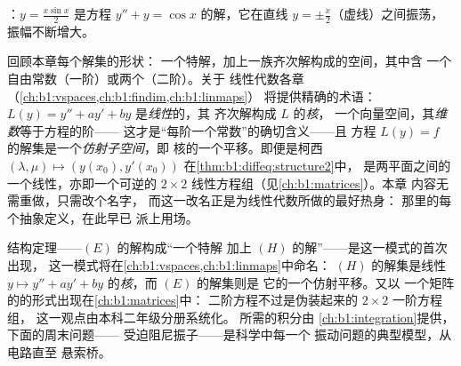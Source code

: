 \begin{omfigure}

{\small {}：$y = \frac{x \sin x}{2}$ 是方程 $y'' + y =
\cos x$ 的解，它在直线 $y = \pm\frac x2$（虚线）之间振荡，
振幅不断增大。}
\end{omfigure}

\begin{remark}[插曲：线性即几何]\label{rem:b1:diffeq:interlude}
回顾本章每个解集的形状：
一个特解，加上一族齐次解构成的空间，其中含
一个自由常数（一阶）或两个（二阶）。关于
线性代数各章（\cref{ch:b1:vspaces,ch:b1:findim,ch:b1:linmaps}）
将提供精确的术语：
 $L(y) = y'' + ay' + by$ 是\emph{线性}的，其
齐次解构成 $L$ 的\emph{核}，
一个向量空间，其\emph{维数}等于方程的阶——
这才是“每阶一个常数”的确切含义——且
方程 $L(y) = f$ 的解集是一个\emph{仿射子空间}，即
核的一个平移。即便是柯西 $(\lambda, \mu)
\mapsto (y(x_0), y'(x_0))$ 在\cref{thm:b1:diffeq:structure2}中，
是两平面之间的一个线性，亦即一个可逆的 $2
\times 2$ 线性方程组（见\cref{ch:b1:matrices}）。本章
内容无需重做，只需改个名字，
而这一改名正是为线性代数所做的最好热身：
那里的每个抽象定义，在此早已
派上用场。
\end{remark}

\begin{remark}[本章的应用]\label{rem:b1:diffeq:whereused}
结构定理——$(E)$ 的解构成“一个特解
加上 $(H)$ 的解”——是这一模式的首次出现，
这一模式将在\cref{ch:b1:vspaces,ch:b1:linmaps}中命名：
$(H)$ 的解集是线性 $y
\mapsto y'' + ay' + by$ 的\emph{核}，而 $(E)$ 的解集则是
它的一个仿射平移。又以
一个矩阵的的形式出现在\cref{ch:b1:matrices}中：
二阶方程不过是伪装起来的 $2 \times 2$ 一阶方程组，
这一观点由本科二年级分册系统化。
所需的积分由
\cref{ch:b1:integration}提供，下面的周末问题——
受迫阻尼振子——是科学中每一个
振动问题的典型模型，从电路直至
悬索桥。
\end{remark}


